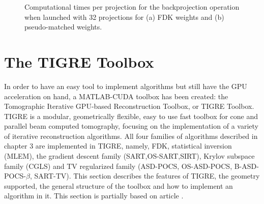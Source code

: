 \begin{figure}
\centering
{}

\caption[Computational times of the backprojection operator, multiple projections]{\label{fig:backprojection32times} Computational times per projection for the backprojection operation when launched with 32 projections for (a) FDK weights and (b) pseudo-matched weights.} 
\end{figure}


\FloatBarrier
\section{The TIGRE Toolbox}

In order to have an easy tool to implement algorithms but still have the GPU acceleration on hand, a MATLAB-CUDA toolbox has been created: the Tomographic Iterative GPU-based Reconstruction Toolbox, or TIGRE Toolbox\cite{TIGREweb}.  TIGRE is a modular, geometrically flexible, easy to use fast toolbox for cone and parallel beam computed tomography, focusing on the implementation of a variety of iterative reconstruction algorithms. All four families of algorithms described in chapter 3 are implemented in TIGRE, namely, FDK, statistical inversion (MLEM), the gradient descent family (SART,OS-SART,SIRT), Krylov subspace family (CGLS) and TV regularized family (\mbox{ASD-POCS},  \mbox{OS-ASD-POCS}, \mbox{B-ASD-POCS-$\beta$}, SART-TV). This section describes the features of TIGRE, the geometry supported, the general structure of the toolbox and how to implement an algorithm in it. This section is partially based on article \cite{TIGRE}.


